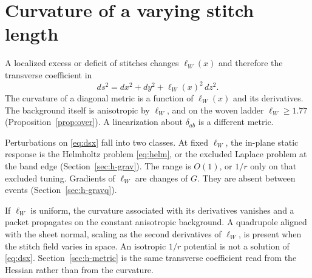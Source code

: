 \section{Curvature of a varying stitch length}
\label{sec:h-gravw}

A localized excess or deficit of stitches changes \(\ell_W(x)\) and
therefore the transverse coefficient in
\begin{equation}
\label{eq:dsx}
ds^2=dx^2+dy^2+\ell_W(x)^2\,dz^2.
\end{equation}
The curvature of a diagonal metric is a function of \(\ell_W(x)\) and its
derivatives.
The background itself is anisotropic by \(\ell_W\), and on the woven
ladder \(\ell_W\ge 1.77\) (Proposition~\ref{prop:over}).
A linearization about \(\delta_{ab}\) is a different metric.

Perturbations on \eqref{eq:dsx} fall into two classes.
At fixed \(\ell_W\), the in-plane static response is the Helmholtz problem
\eqref{eq:helm}, or the excluded Laplace problem at the band edge
(Section~\ref{sec:h-grav}).
The range is \(O(1)\), or \(1/r\) only on that excluded tuning.
Gradients of \(\ell_W\) are changes of \(G\).
They are absent between events (Section~\ref{sec:h-gravq}).

If \(\ell_W\) is uniform, the curvature associated with its derivatives
vanishes and a packet propagates on the constant anisotropic background.
A quadrupole aligned with the sheet normal, scaling as the second
derivatives of \(\ell_W\), is present when the stitch field varies in
space.
An isotropic \(1/r\) potential is not a solution of \eqref{eq:dsx}.
Section~\ref{sec:h-metric} is the same transverse coefficient read from
the Hessian rather than from the curvature.
